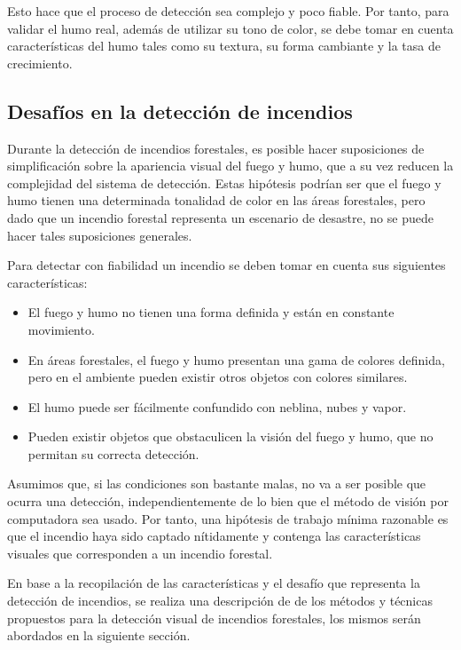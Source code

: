 Esto hace que el proceso de detección sea complejo y poco fiable. Por tanto, para validar el humo real, además de utilizar su tono de color, se debe tomar en cuenta características del humo tales como su textura, su forma cambiante y la tasa de crecimiento.

\subsection{Desafíos en la detección de incendios}

Durante la detección de incendios forestales, es posible hacer suposiciones de simplificación sobre la apariencia visual del fuego y humo, que a su vez reducen la complejidad del sistema de detección. Estas hipótesis podrían ser que el fuego y humo tienen una determinada tonalidad de color en las áreas forestales, pero dado que un incendio forestal representa un escenario de desastre, no se puede hacer tales suposiciones generales. 

Para detectar con fiabilidad un incendio se deben tomar en cuenta sus siguientes características:

\begin{itemize}
\item El fuego y humo no tienen una forma definida y están en constante movimiento.
\item En áreas forestales, el fuego y humo presentan una gama de colores definida, pero en el ambiente pueden existir otros objetos con colores similares.
\item El humo puede ser fácilmente confundido con neblina, nubes y vapor.
\item Pueden existir objetos que obstaculicen la visión del fuego y humo, que no permitan su correcta detección.
\end{itemize}

Asumimos que, si las condiciones son bastante malas, no va a ser posible que ocurra una detección, independientemente de lo bien que el método de visión por computadora sea usado. Por tanto, una hipótesis de trabajo mínima razonable es que el incendio haya sido captado nítidamente y contenga las características visuales que corresponden a un incendio forestal.

En base a la recopilación de las características y el desafío que representa la detección de incendios, se realiza una descripción de de los métodos y técnicas propuestos para la detección visual de incendios forestales, los mismos serán abordados en la siguiente sección.

